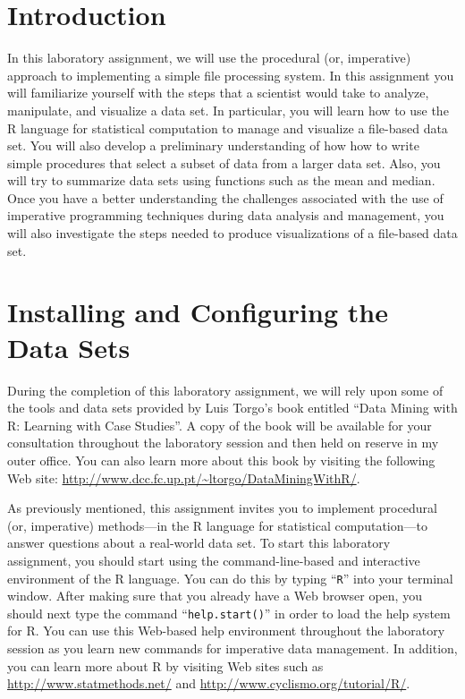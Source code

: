 


\usepackage[compact]{titlesec}



\section*{Introduction}

In this laboratory assignment, we will use the procedural (or, imperative) approach to implementing a simple file
processing system.  In this assignment you will familiarize yourself with the steps that a scientist would take to
analyze, manipulate, and visualize a data set. In particular, you will learn how to use the R language for statistical
computation to manage and visualize a file-based data set. You will also develop a preliminary understanding of how how
to write simple procedures that select a subset of data from a larger data set. Also, you will try to summarize data
sets using functions such as the mean and median. Once you have a better understanding the challenges associated with
the use of imperative programming techniques during data analysis and management, you will also investigate the steps
needed to produce visualizations of a file-based data set.

\section*{Installing and Configuring the Data Sets}

During the completion of this laboratory assignment, we will rely upon some of the tools and data sets provided by Luis
Torgo's book entitled ``Data Mining with R: Learning with Case Studies''. A copy of the book will be available for your
consultation throughout the laboratory session and then held on reserve in my outer office. You can also learn more
about this book by visiting the following Web site: \url{http://www.dcc.fc.up.pt/~ltorgo/DataMiningWithR/}.

As previously mentioned, this assignment invites you to implement procedural (or, imperative) methods---in the R
language for statistical computation---to answer questions about a real-world data set.  To start this laboratory
assignment, you should start using the command-line-based and interactive environment of the R language. You can do this
by typing ``{\tt R}'' into your terminal window. After making sure that you already have a Web browser open, you should
next type the command ``{\tt help.start()}'' in order to load the help system for R. You can use this Web-based help
environment throughout the laboratory session as you learn new commands for imperative data management. In addition, you
can learn more about R by visiting Web sites such as \url{http://www.statmethods.net/} and
\url{http://www.cyclismo.org/tutorial/R/}.


